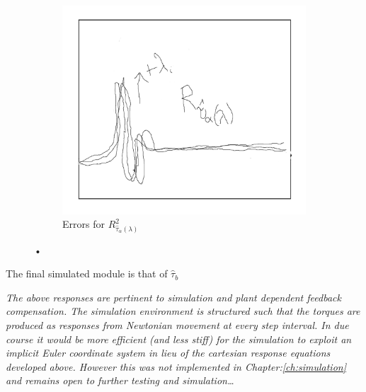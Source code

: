 \begin{figure}[htbp]
\begin{subfigure}{0.49\textwidth}
\includegraphics[width=\textwidth]{graphs/tau-alpha-r}
\caption{Errors for $R^2_{\hat{\tau}_\alpha(\lambda)}$}
\label{fig:tau-alpha-r}
\end{subfigure}
\caption{•}
\end{figure}
\par
The final simulated module is that of $\hat{\tau}_b$
\par
\emph{\color{Gray}The above responses are pertinent to simulation and plant dependent feedback compensation. The simulation environment is structured such that the torques are produced as responses from Newtonian movement at every step interval. In due course it would be more efficient (and less stiff) for the simulation to exploit an implicit Euler\cite{physicallybased,multibodydynamics} coordinate system in lieu of the cartesian response equations developed above. However this was not implemented in Chapter:\ref{ch:simulation} and remains open to further testing and simulation\ldots}
